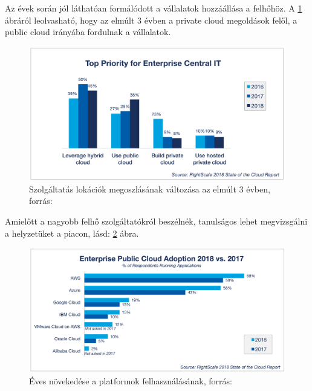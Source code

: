 \documentclass[12pt,oneside,justify,table]{book}
\begin{document}
Az évek során jól láthatóan formálódott a vállalatok hozzáállása a felhőhöz. A \ref{fig:3yearCloudvsOnPrem} ábráról leolvasható, hogy az elmúlt 3 évben a private cloud megoldások felől, a public cloud irányába fordulnak a vállalatok.
\begin{figure}[H]
\centering
\includegraphics[width=1\textwidth]{4-Cloud-Computing-Trends-Enterprises-Prioritizing-Public-Cloud.png}
\caption{Szolgáltatás lokációk megoszlásának változása az elmúlt 3 évben, forrás: \cite{RightScale}}
\label{fig:3yearCloudvsOnPrem}
\end{figure}

Amielőtt a nagyobb felhő szolgáltatókról beszélnék, tanulságos lehet megvizsgálni a helyzetüket a piacon, lásd: \ref{fig:CloudAdoption2017-2018} ábra.
\begin{figure}[H]
\centering
\includegraphics[width=1\textwidth]{22-Cloud-Computing-Trends-Enterprise-Public-Cloud-Adoption-2018-vs-2017.png}
\caption{Éves növekedése a platformok felhasználásának, forrás: \cite{RightScale}}
\label{fig:CloudAdoption2017-2018}
\end{figure}
\end{document}
